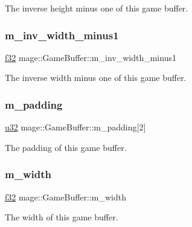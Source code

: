 The inverse height minus one of this game buffer. \hypertarget{structmage_1_1_game_buffer_a5f6f9c999f4bebc5acf88f450dbee698}{}\label{structmage_1_1_game_buffer_a5f6f9c999f4bebc5acf88f450dbee698} 
\subsubsection{\texorpdfstring{m\+\_\+inv\+\_\+width\+\_\+minus1}{m\_inv\_width\_minus1}}
{\footnotesize\ttfamily \hyperlink{namespacemage_a6a44ad388483959dc4dff9f2aef91431}{f32} mage\+::\+Game\+Buffer\+::m\+\_\+inv\+\_\+width\+\_\+minus1}

The inverse width minus one of this game buffer. \hypertarget{structmage_1_1_game_buffer_aace840410122d565d302c78bd82de45e}{}\label{structmage_1_1_game_buffer_aace840410122d565d302c78bd82de45e} 
\subsubsection{\texorpdfstring{m\+\_\+padding}{m\_padding}}
{\footnotesize\ttfamily \hyperlink{namespacemage_af2b398bf98eb10351f49cad73fe2cc73}{u32} mage\+::\+Game\+Buffer\+::m\+\_\+padding\mbox{[}2\mbox{]}}

The padding of this game buffer. \hypertarget{structmage_1_1_game_buffer_ad70c0d08a8d1bf051bfef319acb811c9}{}\label{structmage_1_1_game_buffer_ad70c0d08a8d1bf051bfef319acb811c9} 
\subsubsection{\texorpdfstring{m\+\_\+width}{m\_width}}
{\footnotesize\ttfamily \hyperlink{namespacemage_a6a44ad388483959dc4dff9f2aef91431}{f32} mage\+::\+Game\+Buffer\+::m\+\_\+width}

The width of this game buffer. 